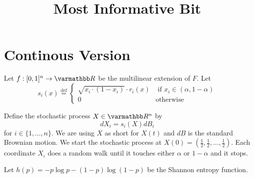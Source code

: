 \documentclass
[12pt,letterpaper]
{article}
\title{
Most Informative Bit}
\author{}
\theoremstyle{definition}
\theoremstyle{remark}
\let\mathbb\varmathbb
\newcommand{\defeq}{\stackrel{\mathrm{def}}=}
\newcommand{\R}{\mathbb R}
\numberwithin{equation}{section}
\begin{document}
\pagestyle{empty}



\maketitle
\thispagestyle{empty} %




\clearpage





\clearpage

\pagestyle{plain}
\setcounter{page}{1}






\section{Continous Version}

Let $f: [0,1]^n \to \R$ be the multilinear extension of $F$.  Let 
\[ s_i(x) \defeq \begin{cases} \sqrt{x_i \cdot (1-x_i)} \cdot r_i(x)  & \text{ if } x_i \in (\alpha,1-\alpha) \\
 0 & \text{otherwise} \end{cases} \]


Define the stochastic process $X \in \R^n$ by
\[ dX_i  = s_i(X) dB_i\]
for $i \in \{1,\ldots, n\}$.   We are using $X$ as short for $X(t)$ and $dB$ is the standard Brownian motion.  We start the stochastic process at $X(0) = (\frac{1}{2},\frac{1}{2},\ldots,\frac{1}{2})$.  Each coordinate $X_\iota$ does a random walk until it touches either $\alpha$ or $1-\alpha$ and it stops.

Let $h(p) = -p\log p - (1-p) \log (1-p)$ be the Shannon entropy function.


%
\end{document}
